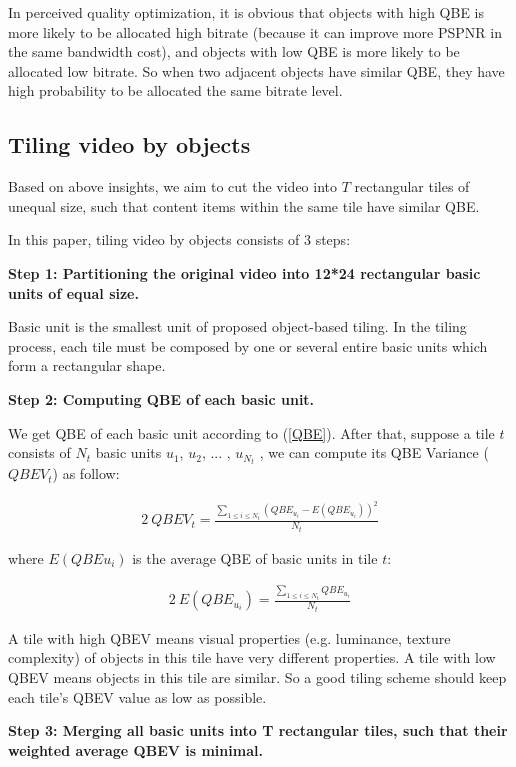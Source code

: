 In perceived quality optimization, it is obvious that objects with high QBE is more likely to be allocated high bitrate (because it can improve more PSPNR in the same bandwidth cost), and objects with low QBE is more likely to be allocated low bitrate. So when two adjacent objects have similar QBE, they have high probability to be allocated the same bitrate level. 

\subsection{Tiling video by objects}

Based on above insights, we aim to cut the video into $T$ rectangular tiles of unequal size, such that content items within the same tile have similar QBE.

In this paper, tiling video by objects consists of 3 steps:

\textbf{Step 1: Partitioning the original video into 12*24 rectangular basic units of equal size.} 

Basic unit is the smallest unit of proposed object-based tiling. In the tiling process, each tile must be composed by one or several entire basic units which form a rectangular shape.

\textbf{Step 2: Computing QBE of each basic unit.}

We get QBE of each basic unit according to (\ref{QBE}). After that, suppose a tile $t$ consists of $N_t$ basic units $u_1$, $u_2$, ... , $u_{N_t}$ , we can compute its QBE Variance ($QBEV_t$) as follow:

\begin{alignat}{2}\
QBEV_t = \frac{\sum_{1 \le i \le N_{t}}{(QBE_{u_i} - E(QBE_{u_{i}}))^2}}{N_t}
\end{alignat}

where $E(QBE{u_i})$ is the average QBE of basic units in tile $t$:

\begin{alignat}{2}\
E(QBE_{u_i}) = \frac{\sum_{1 \le i \le N_{t}}{QBE_{u_i}}}{N_t}
\end{alignat}

A tile with high QBEV means visual properties (e.g. luminance, texture complexity) of objects in this tile have very different properties. A tile with low QBEV means objects in this tile are similar. So a good tiling scheme should keep each tile's QBEV value as low as possible.

\textbf{Step 3: Merging all basic units into T rectangular tiles, such that their weighted average QBEV is minimal.}

